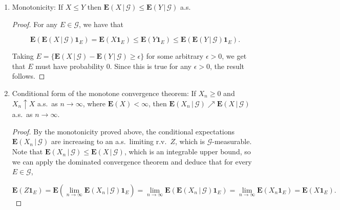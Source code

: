 \documentclass[11pt]{report}
\theoremstyle{plain}
\theoremstyle{definition}
\begin{document}
\begin{enumerate}[label=\arabic*.]
\begin{proof}
\begin{align*}
\mathbf{E}(Z\mathbf{1}_E) &= a\mathbf{E}(\mathbf{E}\left(X\,|\,\mathcal{G}\right)\mathbf{1}_E)+b\mathbf{E}(\mathbf{E}\left(Y\,|\,\mathcal{G}\right)\mathbf{1}_E) =
a \mathbf{E}(X\mathbf{1}_E)+b\mathbf{E}(Y\mathbf{1}_E) \\&=\mathbf{E}((aX+bY)\mathbf{1}_E),
\end{align*}

\noindent so $Z$ satisfies the requirements that qualify it to
be the conditional expectation of $aX+bY$.
\end{proof}

\item Monotonicity: If $X\le Y$ then
$\mathbf{E}\left(X\,|\,\mathcal{G}\right)\le\mathbf{E}\left(Y\,|\,\mathcal{G}\right)$
a.s.

\begin{proof}
For any $E\in\mathcal{G}$, we have that

\[
\mathbf{E}(\mathbf{E}\left(X\,|\,\mathcal{G}\right)\mathbf{1}_E) = \mathbf{E}(X\mathbf{1}_E) \le
\mathbf{E}(Y\mathbf{1}_E) \le \mathbf{E}(\mathbf{E}\left(Y\,|\,\mathcal{G}\right)\mathbf{1}_E).
\]

\noindent Taking
$E=\{\mathbf{E}\left(X\,|\,\mathcal{G}\right)-\mathbf{E}\left(Y\,|\,\mathcal{G}\right)\ge
\epsilon\}$
for some arbitrary $\epsilon>0$, we get that $E$ must
have probability $0$. Since this is true for any
$\epsilon>0$, the result follows.
\end{proof}

\item Conditional form of the monotone convergence theorem:
If $X_n\ge 0$ and $X_n \uparrow X$ a.s.\ as
$n\to\infty$, where $\mathbf{E}(X)<\infty$, then
$\mathbf{E}\left(X_n\,|\,\mathcal{G}\right)\nearrow
\mathbf{E}\left(X\,|\,\mathcal{G}\right)$
a.s.\ as $n\to\infty$.

\begin{proof}
By the monotonicity proved above, the conditional
expectations
$\mathbf{E}\left(X_n\,|\,\mathcal{G}\right)$ are
increasing to an a.s.\ limiting r.v.\ $Z$, which is
$\mathcal{G}$-measurable. Note that
$\mathbf{E}\left(X_n\,|\,\mathcal{G}\right)\le
\mathbf{E}\left(X\,|\,\mathcal{G}\right)$,
which is an integrable upper bound, so we can apply
the dominated convergence theorem and deduce that for
every $E\in \mathcal{G}$,

\[
\mathbf{E}(Z\mathbf{1}_E) = \mathbf{E}(\lim_{n\to\infty} \mathbf{E}\left(X_n\,|\,\mathcal{G}\right)\mathbf{1}_E)
= \lim_{n\to\infty} \mathbf{E}(\mathbf{E}\left(X_n\,|\,\mathcal{G}\right)\mathbf{1}_E) = \lim_{n\to\infty} \mathbf{E}(X_n\mathbf{1}_E)
= \mathbf{E}(X\mathbf{1}_E).
\]


\end{proof}
\end{enumerate}
\end{document}
